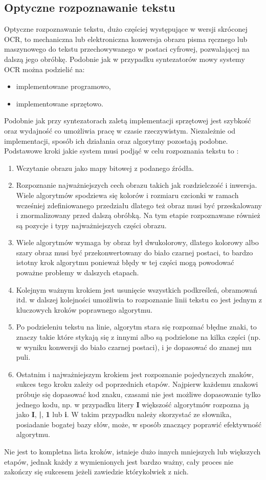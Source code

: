 \subsection{Optyczne rozpoznawanie tekstu}
Optyczne rozpoznawanie tekstu, dużo częściej występujące w wersji skróconej OCR, to mechaniczna lub elektroniczna konwersja obrazu pisma ręcznego lub maszynowego do tekstu przechowywanego w postaci cyfrowej, pozwalającej na dalszą jego obróbkę. Podobnie jak w przypadku syntezatorów mowy systemy OCR można podzielić na:
\begin{itemize}
	\item implementowane programowo,
	\item implementowane sprzętowo.
\end{itemize}
Podobnie jak przy syntezatorach zaletą implementacji sprzętowej jest szybkość oraz wydajność co umożliwia pracę w czasie rzeczywistym. Niezależnie od implementacji, sposób ich działania oraz algorytmy pozostają podobne. Podstawowe kroki jakie system musi podjąć w celu rozpoznania tekstu to \cite{noor2005} :
\begin{enumerate}
	\item Wczytanie obrazu jako mapy bitowej z podanego źródła.
	\item Rozpoznanie najważniejszych cech obrazu takich jak rozdzielczość i inwersja. Wiele algorytmów spodziewa się kolorów i rozmiaru czcionki w ramach wcześniej zdefiniowanego przedziału dlatego też obraz musi być przeskalowany i znormalizowany przed dalszą obróbką. Na tym etapie rozpoznawane również są pozycje i typy najważniejszych części obrazu.
	\item Wiele algorytmów wymaga by obraz był dwukolorowy, dlatego kolorowy albo szary obraz musi być przekonwertowany do biało czarnej postaci, to bardzo istotny krok algorytmu ponieważ błędy w tej części mogą powodować poważne problemy w dalszych etapach.
	\item Kolejnym ważnym krokiem jest usunięcie wszystkich podkreśleń, obramowań itd. w dalszej kolejności umożliwia to rozpoznanie linii tekstu co jest jednym z kluczowych kroków poprawnego algorytmu.
	\item Po podzieleniu tekstu na linie, algorytm stara się rozpoznać błędne znaki, to znaczy takie które stykają się z innymi albo są podzielone na kilka części (np. w wyniku konwersji do biało czarnej postaci), i je dopasować do znanej mu puli.
	\item Ostatnim i najważniejszym krokiem jest rozpoznanie pojedynczych znaków, sukces tego kroku zależy od poprzednich etapów. Najpierw każdemu znakowi próbuje się dopasować kod znaku, czasami nie jest możliwe dopasowanie tylko jednego kodu, np. w przypadku litery \textbf{I} większość algorytmów rozpozna ją jako \textbf{I}, \textbf{|}, \textbf{1} lub \textbf{i}. W takim przypadku należy skorzystać ze słownika, posiadanie bogatej bazy słów, może, w sposób znaczący poprawić efektywność algorytmu.
\end{enumerate}
Nie jest to kompletna lista kroków, istnieje dużo innych mniejszych lub większych etapów, jednak każdy z wymienionych jest bardzo ważny, cały proces nie zakończy się sukcesem jeżeli zawiedzie którykolwiek z nich. 
